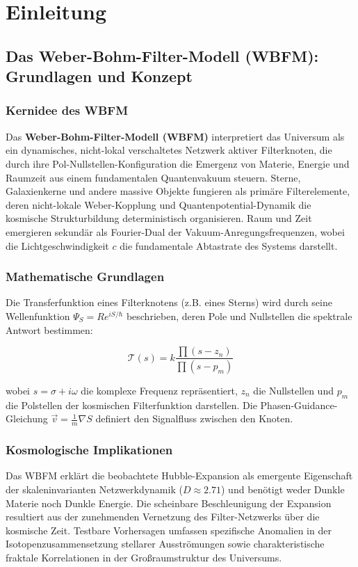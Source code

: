 \chapter{Einleitung}
\section{Das Weber-Bohm-Filter-Modell (WBFM): Grundlagen und Konzept}

\subsection{Kernidee des WBFM}

Das \textbf{Weber-Bohm-Filter-Modell (WBFM)} interpretiert das Universum als ein dynamisches, nicht-lokal verschaltetes Netzwerk aktiver Filterknoten, die durch ihre
Pol-Nullstellen-Konfiguration die Emergenz von Materie, Energie und Raumzeit aus einem fundamentalen Quantenvakuum steuern. Sterne, Galaxienkerne und andere massive Objekte
fungieren als primäre Filterelemente, deren nicht-lokale Weber-Kopplung und Quantenpotential-Dynamik die kosmische Strukturbildung deterministisch organisieren. Raum und Zeit
emergieren sekundär als Fourier-Dual der Vakuum-Anregungsfrequenzen, wobei die Lichtgeschwindigkeit \(c\) die fundamentale Abtastrate des Systems darstellt.

\subsection{Mathematische Grundlagen}

Die Transferfunktion eines Filterknotens (z.B. eines Sterns) wird durch seine Wellenfunktion \(\Psi_S = R e^{iS/\hbar}\) beschrieben, deren Pole und Nullstellen die spektrale
Antwort bestimmen:

\[
\mathcal{T}(s) = k \frac{\prod (s - z_n)}{\prod (s - p_m)}
\]

wobei \(s = \sigma + i\omega\) die komplexe Frequenz repräsentiert, \(z_n\) die Nullstellen und \(p_m\) die Polstellen der kosmischen Filterfunktion darstellen. Die
Phasen-Guidance-Gleichung \(\vec{v} = \frac{1}{m} \nabla S\) definiert den Signalfluss zwischen den Knoten.

\subsection{Kosmologische Implikationen}

Das WBFM erklärt die beobachtete Hubble-Expansion als emergente Eigenschaft der skaleninvarianten Netzwerkdynamik (\(D \approx 2.71\)) und benötigt weder Dunkle Materie noch
Dunkle Energie. Die scheinbare Beschleunigung der Expansion resultiert aus der zunehmenden Vernetzung des Filter-Netzwerks über die kosmische Zeit. Testbare Vorhersagen
umfassen spezifische Anomalien in der Isotopenzusammensetzung stellarer Ausströmungen sowie charakteristische fraktale Korrelationen in der Großraumstruktur des Universums.

